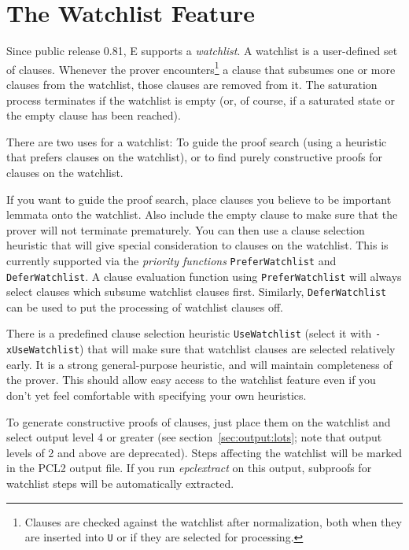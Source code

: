 \documentclass{report}
\begin{document}
\section{The Watchlist Feature}
\label{sec:options:watchlist}

Since public release 0.81, E supports a \emph{watchlist}. A watchlist
is a user-defined set of clauses. Whenever the prover
encounters\footnote{Clauses are checked against the watchlist after
  normalization, both when they are inserted into \texttt{U} or if
  they are selected for processing.} a clause that subsumes one or
more clauses from the watchlist, those clauses are removed from it.
The saturation process terminates if the watchlist is empty (or, of
course, if a saturated state or the empty clause has been reached).

There are two uses for a watchlist: To guide the proof search (using a
heuristic that prefers clauses on the watchlist), or to find purely
constructive proofs for clauses on the watchlist.

If you want to guide the proof search, place clauses you believe to be
important lemmata onto the watchlist. Also include the empty clause to
make sure that the prover will not terminate prematurely.  You can
then use a clause selection heuristic that will give special
consideration to clauses on the watchlist. This is currently supported
via the \emph{priority functions} \texttt{PreferWatchlist} and
\texttt{DeferWatchlist}. A clause evaluation function using
\texttt{PreferWatchlist} will always select clauses which subsume
watchlist clauses first. Similarly, \texttt{DeferWatchlist} can
be used to put the processing of watchlist clauses off.

There is a predefined clause selection heuristic \texttt{UseWatchlist}
(select it with \texttt{-xUseWatchlist}) that will make sure that
watchlist clauses are selected relatively early. It is a strong
general-purpose heuristic, and will maintain completeness of the
prover. This should allow easy access to the watchlist feature even
if you don't yet feel comfortable with specifying your own
heuristics.

To generate constructive proofs of clauses, just place them on the
watchlist and select output level 4 or greater (see
section~\ref{sec:output:lots}; note that output levels of 2 and above
are deprecated). Steps affecting the watchlist will be marked in the
PCL2 output file. If you run \emph{epclextract} on this output,
subproofs for watchlist steps will be automatically extracted.
\end{document}

